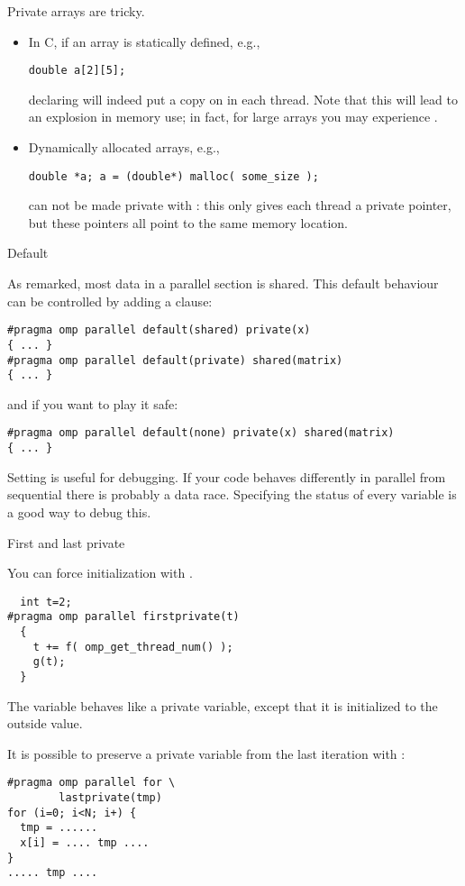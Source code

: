 Private arrays are tricky.
\begin{itemize}
\item In C, if an array is statically defined, e.g.,
\begin{verbatim}
double a[2][5];
\end{verbatim}
declaring  will indeed put a copy on in each thread.
Note that this will lead to an explosion in memory use; in fact, for large arrays you
  may experience .
\item Dynamically allocated arrays, e.g.,
\begin{verbatim}
double *a; a = (double*) malloc( some_size );
\end{verbatim}
can not be made private with : this only gives each thread 
a private pointer, but these pointers all point to the same memory location.
\end{itemize}

 {Default}

As remarked, most data in a parallel section is shared. This default behaviour can be 
controlled by adding a  clause:
\begin{verbatim}
#pragma omp parallel default(shared) private(x)
{ ... }
#pragma omp parallel default(private) shared(matrix)
{ ... }
\end{verbatim}
and if you want to play it safe:
\begin{verbatim}
#pragma omp parallel default(none) private(x) shared(matrix)
{ ... }
\end{verbatim}

Setting  is useful for debugging. If your code
behaves differently in parallel from sequential there is probably a data race.
Specifying the status of every variable is a good way to
debug this.

 {First and last private}

You can force initialization with .
\begin{verbatim}
  int t=2;
#pragma omp parallel firstprivate(t)
  {
    t += f( omp_get_thread_num() );
    g(t);
  }
\end{verbatim}
The variable  behaves like a private variable, except that it is
initialized to the outside value.

It is possible to preserve a private variable
from the last iteration with :
\begin{verbatim}
#pragma omp parallel for \
        lastprivate(tmp)
for (i=0; i<N; i+) {
  tmp = ......
  x[i] = .... tmp ....
}
..... tmp ....
\end{verbatim}


